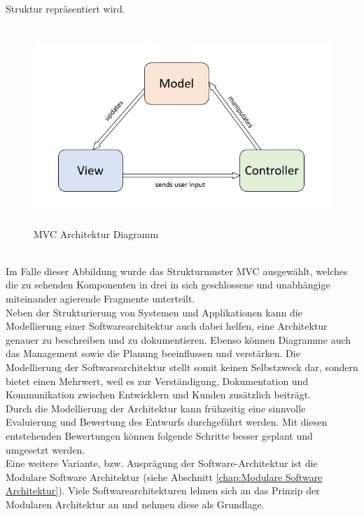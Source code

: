 Struktur repräsentiert wird.
\begin{figure}[hbt!]
    \centering
    \includegraphics[width=15cm,height=7.5cm,keepaspectratio]{2GrundlagenX/Bilder/MVCArchitecture.png}
    \caption{MVC Architektur Diagramm \cite{mvcbild.2020}}
    \label{pic:mvcdiagram}
\end{figure} 
\\
Im Falle dieser Abbildung wurde das Strukturmuster \ac{MVC} ausgewählt, welches die zu sehenden Komponenten in drei in sich 
geschlossene und unabhängige miteinander agierende Fragmente unterteilt. 
\\ 
\linebreak
Neben der Strukturierung von Systemen und Applikationen kann die Modellierung einer Softwarearchitektur auch dabei helfen, eine Architektur genauer 
zu beschreiben und zu dokumentieren. Ebenso können Diagramme auch das Management sowie die Planung beeinflussen und verstärken. Die Modellierung 
der Softwarearchitektur stellt somit keinen Selbstzweck dar, sondern bietet einen Mehrwert, weil es zur Verständigung, Dokumentation und 
Kommunikation zwischen Entwicklern und Kunden zusätzlich beiträgt. 
\\ 
Durch die Modellierung der Architektur kann frühzeitig eine sinnvolle Evaluierung und Bewertung des Entwurfs durchgeführt werden. Mit diesen 
entstehenden Bewertungen können folgende Schritte besser geplant und umgesetzt werden. 
\\ 
\linebreak
Eine weitere Variante, bzw. Ausprägung der Software-Architektur ist die Modulare Software Architektur (siehe Abschnitt \ref{chap:Modulare Software Architektur}).
Viele Softwarearchitekturen lehnen sich an das Prinzip der Modularen Architektur an und nehmen diese als Grundlage.
